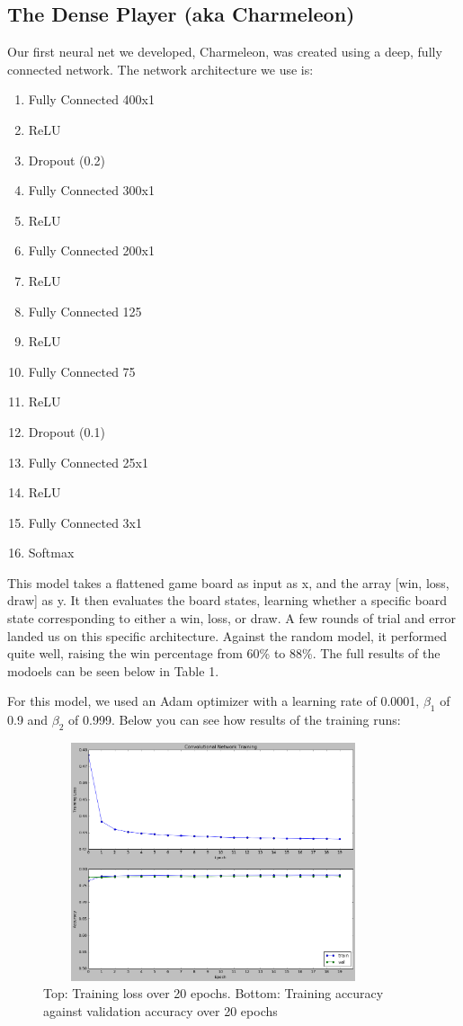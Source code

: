 
\subsection{The Dense Player (aka Charmeleon)}

Our first neural net we developed, Charmeleon, was created using a deep, fully connected  network.
The network architecture we use is:
\begin{enumerate}
	\item Fully Connected 400x1
	\item ReLU
	\item Dropout (0.2)
	\item Fully Connected 300x1
	\item ReLU
	\item Fully Connected 200x1
	\item ReLU
	\item Fully Connected 125
	\item ReLU
	\item Fully Connected 75
	\item ReLU
	\item Dropout (0.1)
	\item Fully Connected 25x1
	\item ReLU
	\item Fully Connected 3x1
	\item Softmax
\end{enumerate}
This model takes a flattened game board as input as x, and the array [win, loss, draw] as y. It then evaluates the board states, learning whether a specific board state corresponding to either a win, loss, or draw. A few rounds of trial and error landed us on this specific architecture. Against the random model, it performed quite well, raising the win percentage from 60\% to 88\%. The full results of the modoels can be seen below in Table 1. 

For this model, we used an Adam optimizer with a learning rate of 0.0001, $\beta_1$ of 0.9 and $\beta_2$ of 0.999. Below you can see how results of the training runs:

\begin{figure}[h!]
	\centering
	\includegraphics[width=10cm, height=7cm]{convolutional-net-training.png}
	\caption{Top: Training loss over 20 epochs. Bottom: Training accuracy against validation accuracy over 20 epochs}
	\label{fig:conv_net}
\end{figure}
